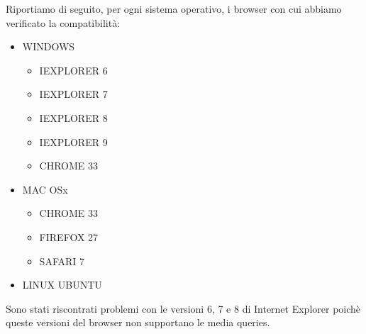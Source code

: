 Riportiamo di seguito, per ogni sistema operativo, i browser con cui abbiamo verificato la compatibilit\`a:
\begin{itemize}
		\item WINDOWS
		\begin{itemize}
			\item IEXPLORER 6
			\item IEXPLORER 7
			\item IEXPLORER 8
			\item IEXPLORER 9
			\item CHROME 33
		\end{itemize}
		\item MAC OSx
		\begin{itemize}
			\item CHROME 33
			\item FIREFOX 27
			\item SAFARI 7
		\end{itemize}
		\item LINUX UBUNTU
		\begin{itemize}
		\end{itemize}
\end{itemize}

Sono stati riscontrati problemi con le versioni 6, 7 e 8 di Internet Explorer poich\`e queste versioni del browser non supportano le media queries.
